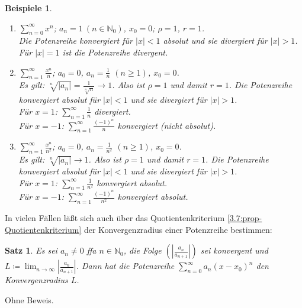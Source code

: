 \documentclass[12pt]{extreport} %
\newcommand{\N}{\mathbb{N}}
\theoremstyle{named}
\theoremstyle{itshape}
\newtheorem{satz}[unnamedtheorem]{Satz}
\theoremstyle{normal}
\newtheorem*{beispiele}{Beispiele}
\begin{document}
\begin{beispiele} ~\
	\begin{enumerate}
		\item $\sum_{n=0}^{\infty} x^{n}$; $a_{n} = 1 ~(n \in \N_{0})$, $x_{0} = 0$; $\rho = 1$, $r = 1$. \\
		Die Potenzreihe konvergiert für $|x| < 1$ absolut und sie divergiert für $|x| > 1$. Für $|x| = 1$ ist die Potenzreihe divergent.
		\item $\sum_{n=1}^{\infty} \frac{x^{n}}{n}$; $a_{0} = 0$, $a_{n} = \frac{1}{n}$ $(n \geq 1)$, $x_{0} = 0$. \\
		 Es gilt: $\sqrt[n]{|a_{n}|} = \frac{1}{\sqrt[n]{n}} \rightarrow 1$. Also ist $\rho = 1$ und damit $r = 1$. Die Potenzreihe konvergiert absolut für $|x| < 1$ und 
		 sie divergiert für $|x| > 1$. \\
		 Für $x = 1$: $\sum_{n=1}^{\infty} \frac{1}{n}$ divergiert. \\
		 Für $x = -1$: $\sum_{n=1}^{\infty} \frac{(-1)^{n}}{n}$ konvergiert (nicht absolut).
		\item $\sum_{n=1}^{\infty} \frac{x^{n}}{n^{2}}$; $a_{0} = 0$, $a_{n} = \frac{1}{n^{2}}$ $(n \geq 1)$, $x_{0} = 0$. \\
		 Es gilt: $\sqrt[n]{|a_{n}|} \rightarrow 1$. Also ist $\rho = 1$ und damit $r = 1$. Die Potenzreihe konvergiert absolut für $|x|< 1$ und sie divergiert für $|x| > 1$. \\
		 Für $x = 1$: $\sum_{n=1}^{\infty} \frac{1}{n^{2}}$ konvergiert absolut. \\
		 Für $x = -1$: $\sum_{n=1}^{\infty} \frac{(-1)^{n}}{n^{2}}$ konvergiert absolut.
	\end{enumerate}	
\end{beispiele}

\bigskip

In vielen Fällen lä{\ss}t sich auch über das Quotientenkriterium \ref{3.7:prop-Quotientenkriterium} der Konvergenzradius einer Potenzreihe bestimmen:
        
\begin{satz} \label{4.4:satz}
	Es sei $a_{n} \neq 0$ ffa $n \in \N_0$, die Folge $\left( \left| \frac{a_{n}}{a_{n+1}} \right| \right)$ sei konvergent und 
	$L \coloneqq \lim_{n\to \infty} \left| \frac{a_{n}}{a_{n+1}} \right|$. Dann hat die Potenzreihe $\sum_{n=0}^{\infty} a_{n} (x - x_{0})^{n}$ den Konvergenzradius $L$.
\end{satz}

Ohne Beweis.
\end{document}
